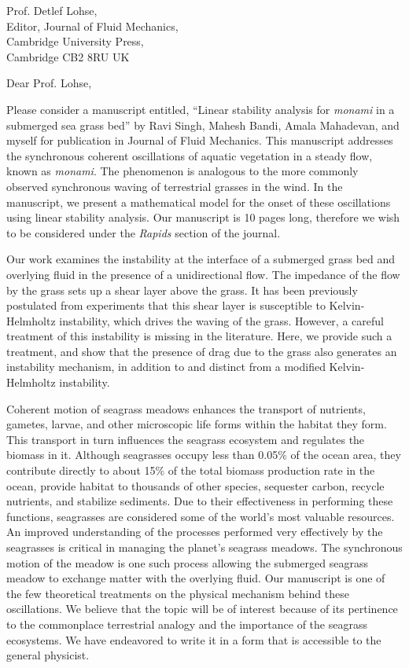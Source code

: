 \documentclass[10pt]{letter}
\date{\today}
\begin{document}
\begin{letter}{
Prof. Detlef Lohse, \\
Editor, Journal of Fluid Mechanics, \\
Cambridge University Press, \\
Cambridge CB2 8RU UK
}
\opening{Dear Prof. Lohse,}

Please consider a manuscript entitled, ``Linear stability analysis for \textit{monami} in a submerged sea grass bed'' by Ravi Singh, Mahesh Bandi, Amala Mahadevan, and myself for publication in Journal of Fluid Mechanics. This manuscript addresses the synchronous coherent oscillations of aquatic vegetation in a steady flow, known as {\it monami}. The phenomenon is analogous to the more commonly observed synchronous waving of terrestrial grasses in the wind. In the manuscript, we present a mathematical model for the onset of these oscillations using linear stability analysis. Our manuscript is 10 pages long, therefore we wish to be considered under the \textit{Rapids} section of the journal.

Our work examines the instability at the interface of a submerged grass bed and overlying fluid in the presence of a unidirectional flow.  The impedance of the flow by the grass sets up a shear layer above the grass.   It has been previously postulated from experiments that this shear layer is susceptible to  Kelvin-Helmholtz instability, which drives the waving of the grass. However, a careful treatment of this instability is missing in the literature. Here, we provide such a treatment, and show that the presence of drag due to the grass also generates an instability mechanism, in addition to and distinct from a modified Kelvin-Helmholtz instability. 

Coherent motion of seagrass meadows enhances the transport of nutrients, gametes, larvae, and other microscopic life forms within the habitat they form. This transport in turn influences the seagrass ecosystem and regulates the biomass in it. Although seagrasses occupy less than 0.05\% of the ocean area, they contribute directly to about 15\% of the total biomass production rate in the ocean, provide habitat to thousands of other species, sequester carbon, recycle nutrients, and stabilize sediments. Due to their effectiveness in performing these functions, seagrasses are considered some of the world's most valuable resources. An improved understanding of the processes performed very effectively by the seagrasses is critical in managing the planet's seagrass meadows. The synchronous motion of the meadow is one such process allowing the submerged seagrass meadow to exchange matter with the overlying fluid. Our manuscript is one of the few theoretical treatments on the physical mechanism behind these oscillations. We believe that the topic will be of interest because of its pertinence to the commonplace terrestrial analogy and the importance of the seagrass ecosystems. We have endeavored to write it in a form that is accessible to the general physicist. 


\end{letter}
\end{document}
